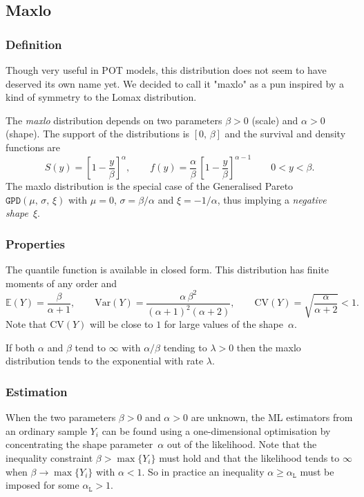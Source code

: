 \documentclass[a4paper]{report}
\newcommand{\Esp}{\mathbb{E}}
\newcommand{\Var}{\textrm{Var}}
\begin{document}
\subsection{Maxlo}
\label{MAXLO}
%
\subsubsection*{Definition}
Though very useful in POT models, this distribution does not seem  
to have deserved its own name yet. We decided to call it "maxlo" as a pun 
inspired by a kind of symmetry to the Lomax distribution.

The \textit{maxlo} distribution depends on two parameters $\beta>0$ (scale) 
and $\alpha>0$ (shape). The support of the distributions is $[0,\,\beta]$ 
and the survival and density functions are
\begin{equation}
  \label{eq:Smaxlo}
  S(y) = \left[1 - \frac{y}{\beta} \right]^{\alpha}, 
  \qquad f(y) = \frac{\alpha}{\beta}\,\left[1 - \frac{y}{\beta} \right]^{\alpha-1} \qquad 0 < y < \beta.
\end{equation}
The maxlo  distribution is the special case of the Generalised Pareto 
$\texttt{GPD}(\mu,\,\sigma,\,\xi)$ with $\mu=0$,
$\sigma = \beta/\alpha$ and $\xi = -1/\alpha$, thus
implying a \textit{negative shape}~$\xi$.

\subsubsection*{Properties}
The quantile function is available in closed form.  
This distribution has finite moments of any order and
$$
\Esp(Y) = \frac{\beta}{\alpha+1},   \qquad 
\Var(Y) = \frac{\alpha \,\beta^2}{(\alpha+1)^2(\alpha+2)}, \qquad
\textrm{CV}(Y) = \sqrt{\frac{\alpha}{\alpha + 2}} < 1.
$$
Note that $\textrm{CV}(Y)$ will be close to $1$ for large values of
the shape~$\alpha$.

If both $\alpha$ and $\beta$ tend to $\infty$ with $\alpha/\beta$ tending to 
$\lambda >0$ then the maxlo distribution tends to the exponential with rate $\lambda$.

\subsubsection*{Estimation}
When the two parameters $\beta>0$ and $\alpha>0$ are unknown, the ML estimators
from an ordinary sample $Y_i$ can be found using a one-dimensional optimisation
by concentrating the shape parameter~$\alpha$ out of the likelihood. Note
that the inequality constraint $\beta>\max \{Y_i\}$ must hold and that the 
likelihood tends to $\infty$ when $\beta \to \max \{Y_i\}$ with $\alpha < 1$.
So in practice an inequality $\alpha \geqslant \alpha_{\texttt{L}}$ must
be imposed for some $\alpha_{\texttt{L}} > 1$.
\end{document}
